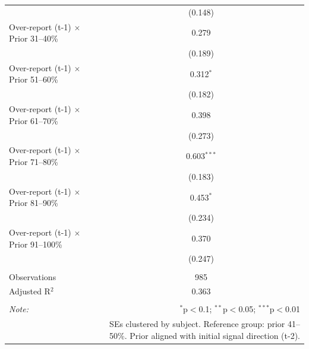 \begin{table}[!htbp]
\begin{tabular}{@{\extracolsep{5pt}}lc}
  & (0.148) \\ 
  Over-report (t-1) $\times$ Prior 31--40\% & 0.279 \\ 
  & (0.189) \\ 
  Over-report (t-1) $\times$ Prior 51--60\% & 0.312$^{*}$ \\ 
  & (0.182) \\ 
  Over-report (t-1) $\times$ Prior 61--70\% & 0.398 \\ 
  & (0.273) \\ 
  Over-report (t-1) $\times$ Prior 71--80\% & 0.603$^{***}$ \\ 
  & (0.183) \\ 
  Over-report (t-1) $\times$ Prior 81--90\% & 0.453$^{*}$ \\ 
  & (0.234) \\ 
  Over-report (t-1) $\times$ Prior 91--100\% & 0.370 \\ 
  & (0.247) \\ 
 \hline \\[-1.8ex] 
Observations & 985 \\ 
Adjusted R$^{2}$ & 0.363 \\ 
\hline 
\hline \\[-1.8ex] 
\textit{Note:}  & \multicolumn{1}{r}{$^{*}$p$<$0.1; $^{**}$p$<$0.05; $^{***}$p$<$0.01} \\ 
 & \multicolumn{1}{r}{SEs clustered by subject. Reference group: prior 41--50\%. Prior aligned with initial signal direction (t-2).} \\ 
\end{tabular} 
\end{table} 
